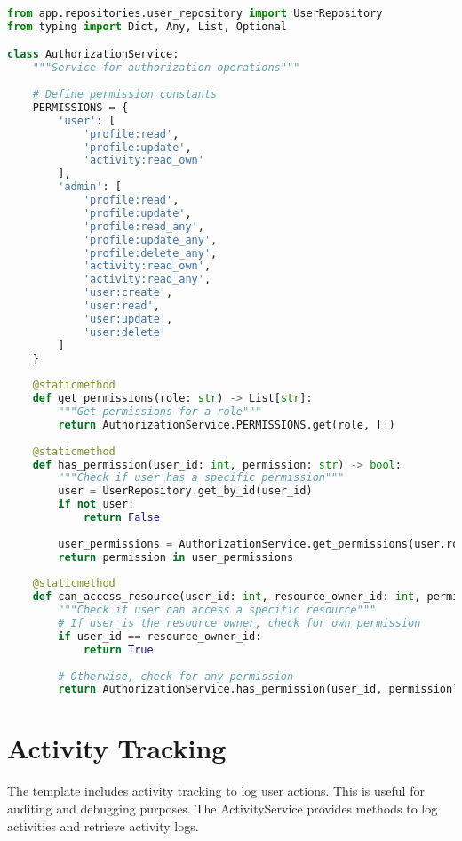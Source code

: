 \documentclass{article}
\begin{document}
\begin{lstlisting}[language=python, caption=Authorization Service in app/services/authorization\_service.py]
from app.repositories.user_repository import UserRepository
from typing import Dict, Any, List, Optional

class AuthorizationService:
    """Service for authorization operations"""
    
    # Define permission constants
    PERMISSIONS = {
        'user': [
            'profile:read',
            'profile:update',
            'activity:read_own'
        ],
        'admin': [
            'profile:read',
            'profile:update',
            'profile:read_any',
            'profile:update_any',
            'profile:delete_any',
            'activity:read_own',
            'activity:read_any',
            'user:create',
            'user:read',
            'user:update',
            'user:delete'
        ]
    }
    
    @staticmethod
    def get_permissions(role: str) -> List[str]:
        """Get permissions for a role"""
        return AuthorizationService.PERMISSIONS.get(role, [])
    
    @staticmethod
    def has_permission(user_id: int, permission: str) -> bool:
        """Check if user has a specific permission"""
        user = UserRepository.get_by_id(user_id)
        if not user:
            return False
        
        user_permissions = AuthorizationService.get_permissions(user.role)
        return permission in user_permissions
    
    @staticmethod
    def can_access_resource(user_id: int, resource_owner_id: int, permission: str) -> bool:
        """Check if user can access a specific resource"""
        # If user is the resource owner, check for own permission
        if user_id == resource_owner_id:
            return True
        
        # Otherwise, check for any permission
        return AuthorizationService.has_permission(user_id, permission)
\end{lstlisting}

\section{Activity Tracking}

The template includes activity tracking to log user actions. This is useful for auditing and debugging purposes. The ActivityService provides methods to log activities and retrieve activity logs.
\end{document}

